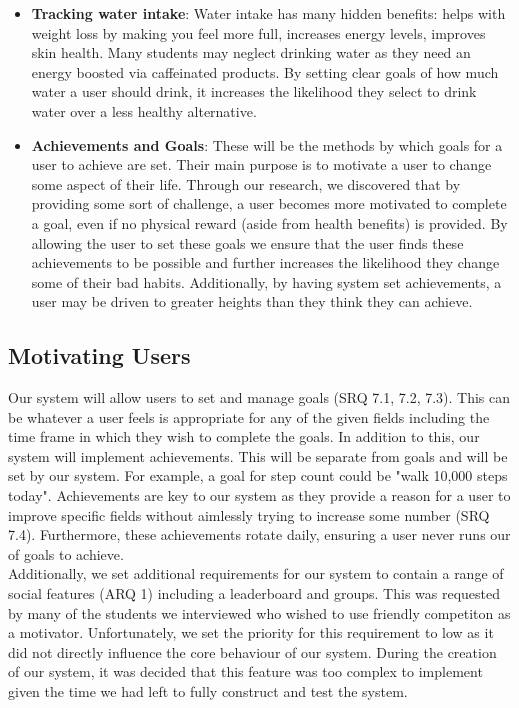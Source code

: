 \documentclass[12pt]{article}
\begin{document}
\begin{itemize}
    \item \textbf{Tracking water intake}: Water intake has many hidden
        benefits: helps with weight loss by making you feel more full,
        increases energy levels, improves skin health. Many students may
        neglect drinking water as they need an energy boosted via caffeinated
        products. By setting clear goals of how much water a user should drink,
        it increases the likelihood they select to drink water over a less
        healthy alternative.

    \item \textbf{Achievements and Goals}: These will be the methods by which goals for a
        user to achieve are set. Their main purpose is to motivate a user to
        change some aspect of their life. Through our research, we discovered
        that by providing some sort of challenge, a user becomes more motivated
        to complete a goal, even if no physical reward (aside from health
        benefits) is provided. By allowing the user to set these goals we
        ensure that the user finds these achievements to be possible and
        further increases the likelihood they change some of their bad habits.
        Additionally, by having system set achievements, a user may be driven to
        greater heights than they think they can achieve.

\end{itemize}


\subsection{Motivating Users}

Our system will allow users to set and manage goals (SRQ 7.1, 7.2, 7.3). This can be whatever a user feels is appropriate for any of the given 
fields including the time frame in which they wish to complete the goals. In addition to this, our system will implement achievements.
This will be separate from goals and will be set by our system. For example, a goal for step count could be "walk 10,000 steps today".
Achievements are key to our system as they provide a reason for a user to improve specific fields
without aimlessly trying to increase some number (SRQ 7.4). Furthermore, these
achievements rotate daily, ensuring a user never runs our of goals to achieve.\\

Additionally, we set additional requirements for our system to contain a range of social features (ARQ 1) including a leaderboard and groups. This was requested by many of the students we interviewed who wished to use friendly competiton as a motivator. Unfortunately, we set the priority for this requirement to low as it did not directly influence the core behaviour of our system. During the creation of our system, it was decided that this feature was too complex to implement given the time we had left to fully construct and test the system.
\end{document}
